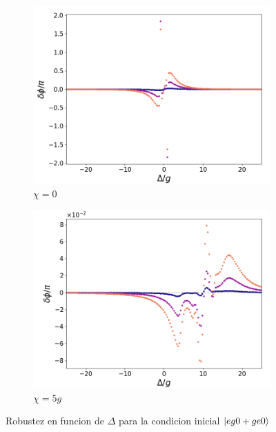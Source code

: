 \begin{figure}[h]
    \centering
    \begin{subfigure}{0.49\textwidth}
        \includegraphics[width=\textwidth]{figuras/ch5/robustez/delta/eg1+ge1 k=0.0g x=0.0g J=0.0g.png}
        \caption{$\chi=0$}
        \label{fig5:robustez detunning 1 eg0}
    \end{subfigure}
    \hfill
    \begin{subfigure}{0.49\textwidth}
        \includegraphics[width=\textwidth]{figuras/ch5/robustez/delta/eg1+ge1 k=0.0g x=5.0g J=0.0g.png}
        \caption{$\chi=5g$}
        \label{fig5:robustez detunning 2 eg0}
    \end{subfigure}
    \vfill

    \caption{Robustez en funcion de $\Delta$ para la condicion inicial $\ket{eg0+ge0}$}
    \label{fig5:robustez detunning eg0}
\end{figure}

